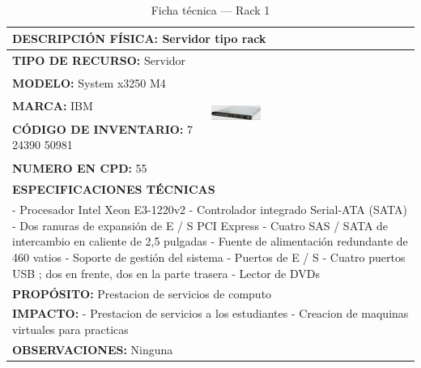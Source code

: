 \begin{table}[H]
\centering
\caption{Ficha técnica --- Rack 1}
\label{tab:rack-1}
\begin{tabular}{|p{}|p{}|}
\hline
\multicolumn{2}{|l|}{\textbf{DESCRIPCIÓN FÍSICA:} Servidor tipo rack} \\ \hline
\textbf{TIPO DE RECURSO:} Servidor & 
\multirow{5}{*}{\includegraphics[width=0.25\textwidth,height=4cm,keepaspectratio]{tablas-images/cp1/racks/rack-1.png}} \\ \cline{1-1}
\textbf{MODELO:} System x3250 M4 & \\ \cline{1-1}
\textbf{MARCA:} IBM & \\ \cline{1-1}
\textbf{CÓDIGO DE INVENTARIO:} 7 24390 50981  & \\ \cline{1-1}
\textbf{NUMERO EN CPD:} 55 & \\ \hline
\multicolumn{2}{|l|}{\textbf{ESPECIFICACIONES TÉCNICAS}} \\ \hline
\multicolumn{2}{|p{0.95\textwidth}|}{
\footnotesize
- Procesador Intel Xeon E3-1220v2
- Controlador integrado Serial-ATA (SATA)
- Dos ranuras de expansión de E / S PCI Express
- Cuatro SAS / SATA de intercambio en caliente de 2,5 pulgadas
- Fuente de alimentación redundante de 460 vatios
- Soporte de gestión del sistema
- Puertos de E / S
- Cuatro puertos USB ; dos en frente, dos en la parte trasera
- Lector de DVDs
} \\ \hline
\multicolumn{2}{|l|}{\textbf{PROPÓSITO:} Prestacion de servicios de computo} \\ \hline
\multicolumn{2}{|p{0.9\textwidth}|}{\textbf{IMPACTO:} - Prestacion de servicios a los estudiantes
- Creacion de maquinas virtuales para practicas} \\ \hline
\multicolumn{2}{|p{0.9\textwidth}|}{\textbf{OBSERVACIONES:} Ninguna} \\ \hline
\end{tabular}
\end{table}

